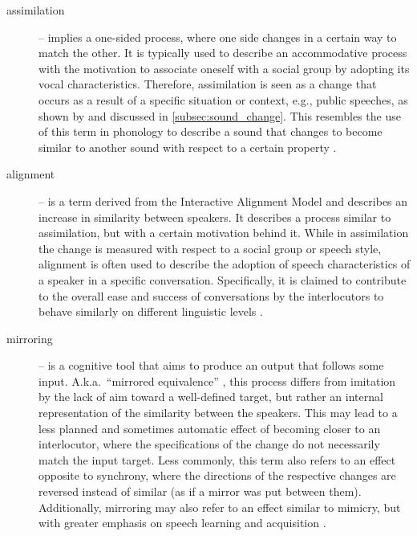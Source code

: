 \begin{description}
	\item[assimilation] -- implies a one-sided process, where one side changes in a certain way to match the other.
	It is typically used to describe an accommodative process with the motivation to associate oneself with a social group by adopting its vocal characteristics.
	Therefore, assimilation is seen as a change that occurs as a result of a specific situation or context, e.g., public speeches, as shown by \citet{Ohala1990phonetics} and discussed in \cref{subsec:sound_change}.
	This resembles the use of this term in phonology to describe a sound that changes to become similar to another sound with respect to a certain property \citep[see examples in][pp.~89-98]{Hall2011phonologie}.
	
	\item[alignment] -- is a term derived from the Interactive Alignment Model \citep{Pickering2004behavioral} and describes an increase in similarity between speakers.
	It describes a process similar to assimilation, but with a certain motivation behind it.
	While in assimilation the change is measured with respect to a social group or speech style, alignment is often used to describe the adoption of speech characteristics of a speaker in a specific conversation.
	Specifically, it is claimed to contribute to the overall ease and success of conversations by the interlocutors to behave similarly on different linguistic levels \citep{Garrod2009joint}.
	
	\item[mirroring] -- is a cognitive tool that aims to produce an output that follows some input.
	A.k.a.\ \enquote{mirrored equivalence} \citep{Messum2015creating, Messum2007mirroring}, this process differs from imitation by the lack of aim toward a well-defined target, but rather an internal representation of the similarity between the speakers.
	This may lead to a less planned and sometimes automatic effect of becoming closer to an interlocutor, where the specifications of the change do not necessarily match the input target.
	Less commonly, this term also refers to an effect opposite to synchrony, where the directions of the respective changes are reversed instead of similar (as if a mirror was put between them).
	Additionally, mirroring may also refer to an effect similar to mimicry, but with greater emphasis on speech learning and acquisition \citep[e.g.,][]{Yoshikawa2003constructivist}.
	

\end{description}
